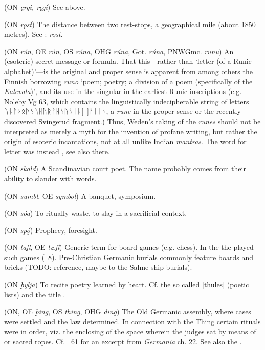 \begin{itemize}
 (ON \emph{ęrgi, ręgi})
  See  above.

 (ON \emph{rǫst})
  The distance between two rest-stops, a geographical mile (about 1850 metres).  See \CV: \emph{rǫst}.

 (ON \emph{rún}, OE \emph{rún}, OS \emph{rúna}, OHG \emph{rúna}, Got. \emph{rúna}, PNWGmc. \emph{rūnu})
  An (esoteric) secret message or formula. That this—rather than ‘letter (of a Runic alphabet)’—is the original and proper sense is apparent from among others the Finnish borrowing \emph{runo} ‘poem; poetry; a division of a poem (specifically of the \emph{Kalevala})’, and its use in the singular in the earliest Runic inscriptions (e.g. Noleby Vg 63, which contains the linguistically indecipherable string of letters {ᚢᚾᚨᚦᛟᚢᛊᚢᚺᚢᚱᚨᚺᛊᚢᛊᛁᚺ[--]ᚨᛁᛁᚾ}, a \emph{rune} in the proper sense or the recently discovered Svingerud fragment.) Thus, Weden’s taking of the \emph{runes} should not be interpreted as merely a myth for the invention of profane writing, but rather the origin of esoteric incantations, not at all unlike Indian \emph{mantras}.
  The word for letter was instead , see also there.

 (ON \emph{skald})
  A Scandinavian court poet.  The name probably comes from their ability to slander with words.

 (ON \emph{sumbl}, OE \emph{symbol})
  A banquet, symposium.

 (ON \emph{sóa})
  To ritually waste, to slay in a sacrificial context.

 (ON \emph{spǫ́})
  Prophecy, foresight.

 (ON \emph{tafl}, OE \emph{tæfl})
  Generic term for board games (e.g. chess).  In the  the  played such games (\Voluspa\ 8).  Pre-Christian Germanic burials commonly feature boards and bricks (TODO: reference, maybe to the Salme ship burials).

 (ON \emph{þylja})
  To recite poetry learned by heart.  Cf. the so called [thules] (poetic lists) and the title .

 (ON, OE \emph{þing}, OS \emph{thing}, OHG \emph{ding})
  The Old Germanic assembly, where cases were settled and the law determined.  In connection with the Thing certain rituals were in order, viz. the enclosing of the space wherein the judges sat by means of  or sacred ropes.  Cf. \Havamal\ 61 for an excerpt from \emph{Germania} ch. 22.  See also the .


\end{itemize}
